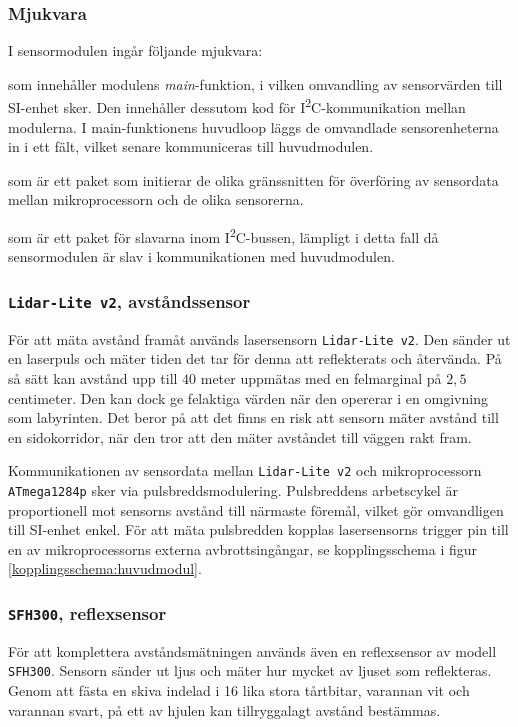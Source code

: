 \documentclass[11pt]{article}
\begin{document}
\begin{flushleft}
\subsubsection{Mjukvara}
I sensormodulen ingår följande mjukvara: 

\begin{description}[style=unboxed, leftmargin=0cm]
\item[sensorModule.c] som innehåller modulens \textit{main}-funktion, i vilken omvandling av sensorvärden till SI-enhet sker. Den innehåller dessutom kod för I\textsuperscript{2}C-kommunikation mellan modulerna. I main-funktionens huvudloop läggs de omvandlade sensorenheterna in i ett fält, vilket senare kommuniceras till huvudmodulen.
\item[sensorInit.h] som är ett paket som initierar de olika gränssnitten för överföring av sensordata mellan mikroprocessorn och de olika sensorerna.
\item[I2C\_slave.h] som är ett paket för slavarna inom I\textsuperscript{2}C-bussen, lämpligt i detta fall då sensormodulen är slav i kommunikationen med huvudmodulen.
\end{description}

\subsubsection{\texttt{Lidar-Lite v2}, avståndssensor}
För att mäta avstånd framåt används lasersensorn \verb+Lidar-Lite v2+. Den sänder ut en laserpuls och mäter tiden det tar för denna att reflekterats och återvända. På så sätt kan avstånd upp till $40$ meter uppmätas med en felmarginal på $2,5$ centimeter. Den kan dock ge felaktiga värden när den opererar i en omgivning som labyrinten. Det beror på att det finns en risk att sensorn mäter avstånd till en sidokorridor, när den tror att den mäter avståndet till väggen rakt fram.

Kommunikationen av sensordata mellan \verb+Lidar-Lite v2+ och mikroprocessorn \verb+ATmega1284p+ sker via pulsbreddsmodulering. Pulsbreddens arbetscykel är proportionell mot sensorns avstånd till närmaste föremål, vilket gör omvandligen till SI-enhet enkel. För att mäta pulsbredden kopplas lasersensorns trigger pin till en av mikroprocessorns externa avbrottsingångar, se kopplingsschema i figur \ref{kopplingsschema:huvudmodul}. 

\subsubsection{\texttt{SFH300}, reflexsensor}
För att komplettera avståndsmätningen används även en reflexsensor av modell \verb+SFH300+. Sensorn sänder ut ljus och mäter hur mycket av ljuset som reflekteras. Genom att fästa en skiva indelad i 16 lika stora tårtbitar, varannan vit och varannan svart, på ett av hjulen kan tillryggalagt avstånd bestämmas.


\end{flushleft}
\end{document}
